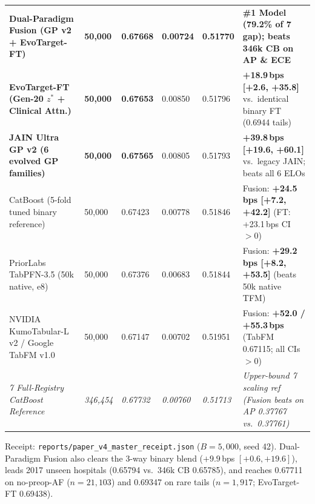 \documentclass[8.8pt,letterpaper]{article}
\begin{document}
\vspace{2.5pt}
\noindent
{\fontsize{7.25}{8.9}\selectfont\setlength{\tabcolsep}{3.8pt}
\begin{tabularx}{\textwidth}{@{}L{4.75cm}R{1.25cm}R{1.45cm}R{1.25cm}R{1.35cm}Y@{}}
\toprule
{} &  &  &  &  &  \\
\midrule
{}
\textbf{Dual-Paradigm Fusion (GP v2 + EvoTarget-FT)} & \textbf{50,000} & \textbf{0.67668} & \textbf{0.00724} & \textbf{0.51770} & \textbf{\#1 Model (79.2\% of 7\x{} gap); beats 346k CB on AP \& ECE} \\
\textbf{\color{accent}EvoTarget-FT (Gen-20 $z^*$ + Clinical Attn.)} & \textbf{50,000} & \textbf{0.67653} & 0.00850 & 0.51796 & \textbf{+18.9\,bps [+2.6, +35.8]} vs.\ identical binary FT (0.6944 tails) \\
\textbf{\color{teal}JAIN Ultra GP v2 (6 evolved GP families)} & \textbf{50,000} & \textbf{0.67565} & 0.00805 & 0.51793 & \textbf{+39.8\,bps [+19.6, +60.1]} vs.\ legacy JAIN; beats all 6 ELOs \\
CatBoost (5-fold tuned binary reference) & 50,000 & 0.67423 & 0.00778 & 0.51846 & Fusion: \textbf{+24.5\,bps [+7.2, +42.2]} (FT: +23.1\,bps CI $>0$) \\
PriorLabs TabPFN-3.5 (50k native, e8) & 50,000 & 0.67376 & 0.00683 & 0.51844 & Fusion: \textbf{+29.2\,bps [+8.2, +53.5]} (beats 50k native TFM) \\
NVIDIA KumoTabular-L v2 / Google TabFM v1.0 & 50,000 & 0.67147 & 0.00702 & 0.51951 & Fusion: \textbf{+52.0 / +55.3\,bps} (TabFM 0.67115; all CIs $>0$) \\
\midrule
\textit{7\x{} Full-Registry CatBoost Reference} & \textit{346,454} & \textit{0.67732} & \textit{0.00760} & \textit{0.51713} & \textit{Upper-bound 7\x{} scaling ref (Fusion beats on AP 0.37767 vs.\ 0.37761)} \\
\bottomrule
\end{tabularx}}
\vspace{1.2pt}
{\noindent\sffamily\fontsize{6.1}{7.5}\selectfont\color{sub}Receipt: \texttt{reports/paper\_v4\_master\_receipt.json} ($B{=}5{,}000$, seed 42). Dual-Paradigm Fusion also clears the 3-way binary blend ($+9.9$\,bps $[+0.6, +19.6]$), leads 2017 unseen hospitals (0.65794 vs.\ 346k CB 0.65785), and reaches 0.67711 on no-preop-AF ($n{=}21{,}103$) and 0.69347 on rare tails ($n{=}1{,}917$; EvoTarget-FT 0.69438).\par}
\end{document}
